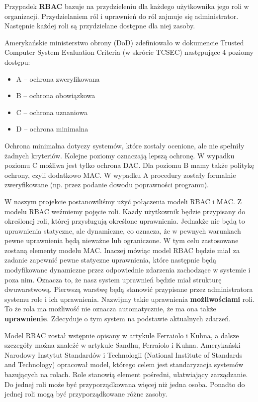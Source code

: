 \documentclass{classrep}
\begin{document}
Przypadek \textbf{RBAC} bazuje na przydzieleniu dla każdego użytkownika jego roli w organizacji. Przydzielaniem ról i uprawnień do ról zajmuje się administrator. Następnie każdej roli
są przydzielane dostępne dla niej zasoby.

Amerykańskie ministerstwo obrony (DoD) zdefiniowało w dokumencie Trusted Computer System Evaluation Criteria\cite{TCSEC} (w skrócie TCSEC) następujące 4 poziomy dostępu:
\begin{itemize}
\item A -- ochrona zweryfikowana
\item B -- ochrona obowiązkowa
\item C -- ochrona uznaniowa
\item D -- ochrona minimalna
\end{itemize}

Ochrona minimalna dotyczy systemów, które zostały ocenione, ale nie spełniły żadnych kryteriów. Kolejne poziomy oznaczają lepszą ochronę. W wypadku poziomu C możliwa jest
tylko ochrona DAC. Dla poziomu B mamy także politykę ochrony, czyli dodatkowo MAC. W wypadku A procedury zostały formalnie zweryfikowane (np. przez podanie dowodu poprawności programu).

W naszym projekcie postanowiliśmy użyć połączenia modeli RBAC i MAC. Z modelu RBAC weźmiemy pojęcie roli. Każdy użytkownik będzie przypisany do określonej roli, której przysługują
określone uprawnienia. Jednakże nie będą to uprawnienia statyczne, ale dynamiczne, co oznacza, że w pewnych warunkach pewne uprawnienia będą nieważne lub ograniczone.
W tym celu zastosowane zostaną elementy modelu MAC. Inaczej mówiąc model RBAC będzie miał za zadanie zapewnić pewne statyczne uprawnienia, które następnie będą modyfikowane dynamiczne
przez odpowiednie zdarzenia zachodzące w systemie i poza nim. Oznacza to, że nasz system uprawnień będzie miał strukturę dwuwarstwową. Pierwszą warstwę będą stanowić
przypisane przez administratora systemu role i ich uprawnienia. Nazwijmy takie uprawnienia \textbf{możliwościami} roli. To że rola ma możliwość nie oznacza automatycznie,
że ma ona także \textbf{uprawnienie}. Zdecyduje o tym system na podstawie aktualnych zdarzeń.

Model RBAC został wstępnie opisany w artykule Ferraiolo i Kuhna\cite{RBAC}, a dalsze szczegóły można znaleźć w artykule Sandhu, Ferraiolo i Kuhna\cite{NISTModel}.
Amerykański Narodowy Instytut Standardów i Technologii (National Institute of Standards and Technology) opracował model\cite{NIST}, którego celem jest standaryzacja systemów
bazujących na rolach. Role stanowią element pośredni, ułatwiający zarządzanie. Do jednej roli może być przyporządkowana więcej niż jedna osoba. Ponadto do jednej roli mogą być
przyporządkowane różne zasoby.
\end{document}
